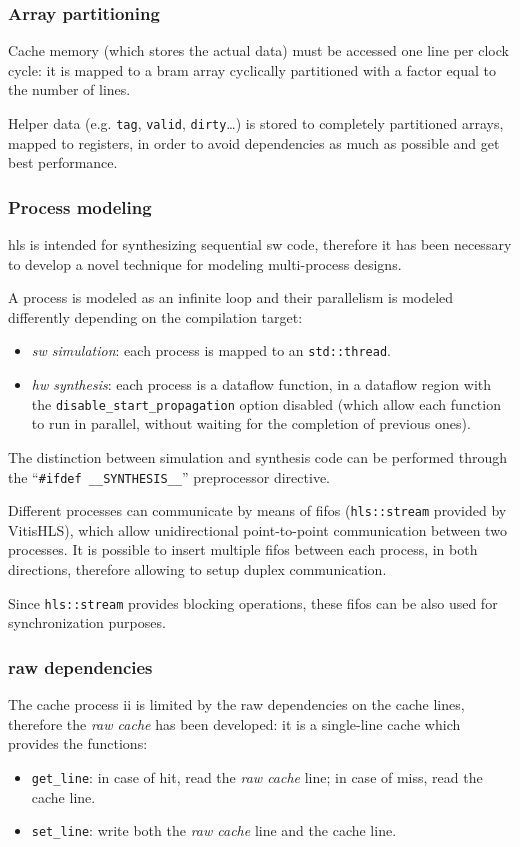 \documentclass[11pt,a4paper,oneside]{memoir}
\begin{document}
\subsubsection{Array partitioning}
Cache memory (which stores the actual data) must be accessed one line per clock
cycle: it is mapped to a \ac{bram} array cyclically partitioned with a factor
equal to the number of lines.

Helper data (e.g. \texttt{tag}, \texttt{valid}, \texttt{dirty}\ldots) is stored
to completely partitioned arrays, mapped to registers, in order to avoid
dependencies as much as possible and get best performance.

\subsubsection{Process modeling}
\ac{hls} is intended for synthesizing sequential \acl{sw} code, therefore it has
been necessary to develop a novel technique for modeling multi-process designs.

A process is modeled as an infinite loop and their parallelism is modeled
differently depending on the compilation target:
\begin{itemize}
	\item \emph{\ac{sw} simulation}: each process is mapped to an
		\texttt{std::thread}.
	\item \emph{\ac{hw} synthesis}: each process is a dataflow function, in
		a dataflow region with the \texttt{disable\_start\_propagation}
		option disabled (which allow each function to run in parallel,
		without waiting for the completion of previous ones).
\end{itemize}
The distinction between simulation and synthesis code can be performed through
the ``\texttt{\#ifdef \_\_SYNTHESIS\_\_}'' preprocessor directive.

Different processes can communicate by means of \acp{fifo} (\texttt{hls::stream}
provided by Vitis\texttrademark HLS), which allow unidirectional point-to-point
communication between two processes. It is possible to insert multiple
\acp{fifo} between each process, in both directions, therefore allowing to
setup duplex communication.

Since \texttt{hls::stream} provides blocking operations, these \acp{fifo} can
be also used for synchronization purposes.

\subsubsection{\acl{raw} dependencies}
The cache process \ac{ii} is limited by the \ac{raw} dependencies on the cache
lines, therefore the \emph{\ac{raw} cache} has been developed: it is a
single-line cache which provides the functions:
\begin{itemize}
	\item \texttt{get\_line}: in case of hit, read the \emph{\ac{raw}
		cache} line; in case of miss, read the cache line.
	\item \texttt{set\_line}: write both the \emph{\ac{raw} cache} line and
		the cache line.
\end{itemize}
\end{document}
